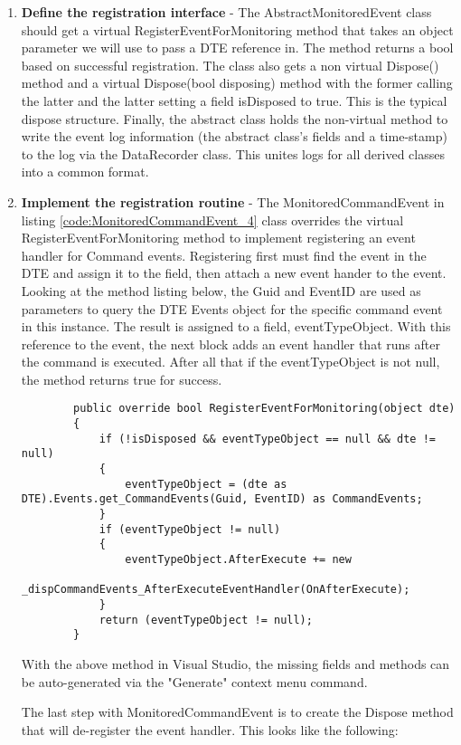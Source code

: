 \begin{enumerate}
\item {\bf Define the registration interface } - 
The AbstractMonitoredEvent class should get a virtual RegisterEventForMonitoring method that takes an object parameter we will use to pass a DTE reference in.  The method returns a bool based on successful registration.  The class also gets a non virtual Dispose() method  and a virtual Dispose(bool disposing) method with the former calling the latter and the latter setting a field isDisposed to true. This is the typical dispose structure.  Finally, the abstract class holds the non-virtual method to write the event log information (the abstract class's fields and a time-stamp) to the log via the DataRecorder class.  This unites logs for all derived classes into a common format.

\item {\bf Implement the registration routine} - 
The MonitoredCommandEvent in listing \ref{code:MonitoredCommandEvent_4} class overrides the virtual RegisterEventForMonitoring method to implement registering an event handler for Command events.  Registering first must find the event in the DTE and assign it to the field, then attach a new event hander to the event.  Looking at the method listing below, the Guid and EventID are used as parameters to query the DTE Events object for the specific command event in this instance.  The result is assigned to a field, eventTypeObject.  With this reference to the event, the next block adds an event handler that runs after the command is executed.  After all that if the eventTypeObject is not null, the method returns true for success.
\begin{lstlisting}
        public override bool RegisterEventForMonitoring(object dte)
        {
            if (!isDisposed && eventTypeObject == null && dte != null)
            {
                eventTypeObject = (dte as DTE).Events.get_CommandEvents(Guid, EventID) as CommandEvents;
            }
            if (eventTypeObject != null)
            {
                eventTypeObject.AfterExecute += new 
			_dispCommandEvents_AfterExecuteEventHandler(OnAfterExecute);
            }
            return (eventTypeObject != null);
        }
\end{lstlisting}

With the above method in Visual Studio, the missing fields and methods can be auto-generated via the "Generate" context menu command.  

The last step with MonitoredCommandEvent is to create the Dispose method that will de-register the event handler. This looks like the following:


\end{enumerate}
